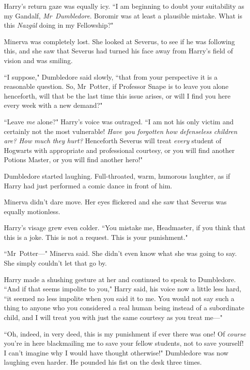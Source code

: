 Harry's return gaze was equally icy. ``I am beginning to doubt your suitability as my Gandalf, \emph{Mr~Dumbledore}. Boromir was at least a plausible mistake. What is this \emph{Nazgûl} doing in my Fellowship?"

Minerva was completely lost. She looked at Severus, to see if he was following this, and she saw that Severus had turned his face away from Harry's field of vision and was smiling.

``I suppose," Dumbledore said slowly, ``that from your perspective it is a reasonable question. So, Mr~Potter, if Professor Snape is to leave you alone henceforth, will that be the last time this issue arises, or will I find you here every week with a new demand?"

``Leave \emph{me} alone?" Harry's voice was outraged. ``I am not his only victim and certainly not the most vulnerable! \emph{Have you forgotten how defenseless children are? How much they hurt?} Henceforth Severus will treat \emph{every} student of Hogwarts with appropriate and professional courtesy, or you will find another Potions Master, or you will find another hero!"

Dumbledore started laughing. Full-throated, warm, humorous laughter, as if Harry had just performed a comic dance in front of him.

Minerva didn't dare move. Her eyes flickered and she saw that Severus was equally motionless.

Harry's visage grew even colder. ``You mistake me, Headmaster, if you think that this is a joke. This is not a request. This is your punishment."

``Mr~Potter—" Minerva said. She didn't even know what she was going to say. She simply couldn't let that go by.

Harry made a shushing gesture at her and continued to speak to Dumbledore. ``And if that seems impolite to you," Harry said, his voice now a little less hard, ``it seemed no less impolite when you said it to me. You would not say such a thing to anyone who you considered a real human being instead of a subordinate child, and I will treat you with just the same courtesy as you treat me—"

``Oh, indeed, in very deed, this is my punishment if ever there was one! Of \emph{course} you're in here blackmailing me to save your fellow students, not to save yourself! I can't imagine why I would have thought otherwise!" Dumbledore was now laughing even harder. He pounded his fist on the desk three times.

